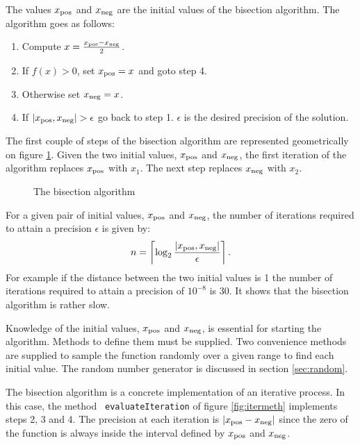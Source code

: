 \documentclass[twoside]{book}
\begin{document}
The values $x_{\mathop{\rm pos}}$ and $x_{\mathop{\rm neg}}$ are
the initial values of the bisection algorithm. The algorithm goes
as follows:
\begin{enumerate}
  \item Compute $x={x_{\mathop{\rm pos}}-x_{\mathop{\rm neg}}\over
  2}$.
  \item If $f\left(x\right)>0$, set $x_{\mathop{\rm pos}}=x$ and
  goto step 4.
  \item Otherwise set $x_{\mathop{\rm neg}}=x$.
  \item If $\left|
x_{\mathop{\rm pos}},x_{\mathop{\rm neg}}\right|>\epsilon$ go back
to step 1. $\epsilon$ is the desired precision of the solution.
\end{enumerate}
The first couple of steps of the bisection algorithm are
represented geometrically on figure \ref{fig:bisection}. Given the
two initial values, $x_{\mathop{\rm pos}}$ and $x_{\mathop{\rm
neg}}$, the first iteration of the algorithm replaces
$x_{\mathop{\rm pos}}$ with $x_1$. The next step replaces
$x_{\mathop{\rm neg}}$ with $x_2$.
\begin{figure}
\center{}
\caption{The bisection algorithm}\label{fig:bisection}
\end{figure}

For a given pair of initial values, $x_{\mathop{\rm pos}}$ and
$x_{\mathop{\rm neg}}$, the number of iterations required to
attain a precision $\epsilon$ is given by:
\begin{equation}
\label{eq:bissectime}
  n=\left\lceil\log_2{\displaystyle\left|
x_{\mathop{\rm pos}},x_{\mathop{\rm neg}}\right| \over
\displaystyle\epsilon}\right\rceil.
\end{equation}
For example if the distance between the two initial values is 1
the number of iterations required to attain a precision of
$10^{-8}$ is 30. It shows that the bisection algorithm is rather
slow.

Knowledge of the initial values, $x_{\mathop{\rm pos}}$ and
$x_{\mathop{\rm neg}}$, is essential for starting the algorithm.
Methods to define them must be supplied. Two convenience methods
are supplied to sample the function randomly over a given range to
find each initial value. The random number generator is discussed
in section \ref{sec:random}.

The bisection algorithm is a concrete implementation of an
iterative process. In this case, the method {\tt
evaluateIteration} of figure \ref{fig:itermeth} implements steps
2, 3 and 4. The precision at each iteration is $\left|
x_{\mathop{\rm pos}}-x_{\mathop{\rm neg}}\right|$ since the zero
of the function is always inside the interval defined by
$x_{\mathop{\rm pos}}$ and $x_{\mathop{\rm neg}}$.
\end{document}
